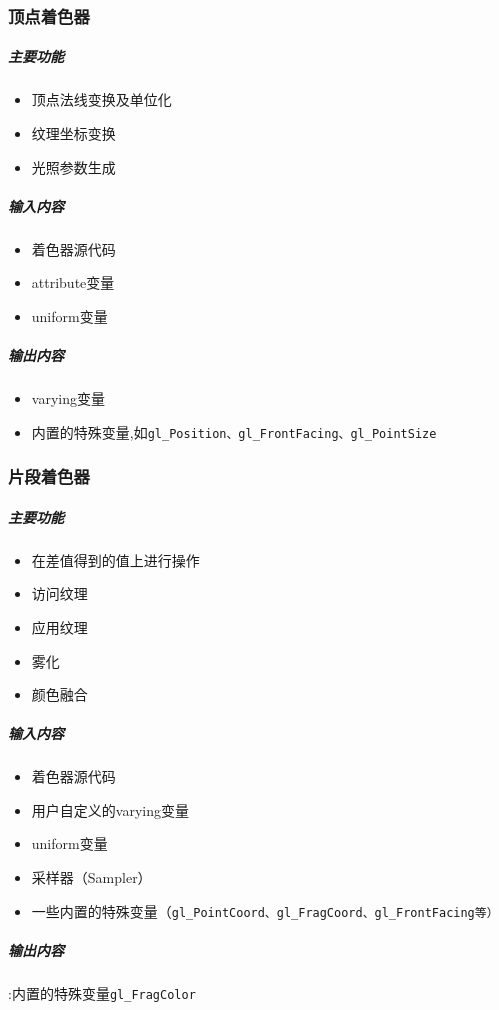 \documentclass[UTF8,a4paper,8pt]{ctexart}
\begin{document}
		\subsubsection{顶点着色器}
			\subparagraph{主要功能}
				\begin{itemize}[itemindent = 1em]
					\item 顶点法线变换及单位化
					\item 纹理坐标变换
					\item 光照参数生成
				\end{itemize}
			\subparagraph{输入内容}
				\begin{itemize}[itemindent = 1em]
					\item 着色器源代码
					\item attribute变量
					\item uniform变量
				\end{itemize}
			\subparagraph{输出内容}
				\begin{itemize}[itemindent = 1em]
					\item varying变量
					\item 内置的特殊变量,如\verb|gl_Position、gl_FrontFacing、gl_PointSize|
				\end{itemize}
		\subsubsection{片段着色器}
			\subparagraph{主要功能}
				\begin{itemize}[itemindent = 1em]
					\item 在差值得到的值上进行操作
					\item 访问纹理
					\item 应用纹理
					\item 雾化
					\item 颜色融合
				\end{itemize}
			\subparagraph{输入内容}
				\begin{itemize}[itemindent = 1em]
					\item 着色器源代码
					\item 用户自定义的varying变量
					\item uniform变量
					\item 采样器（Sampler）
					\item 一些内置的特殊变量（\verb|gl_PointCoord、gl_FragCoord、gl_FrontFacing等）|	
				\end{itemize}
			\subparagraph{输出内容}:内置的特殊变量\verb|gl_FragColor|
\end{document}
